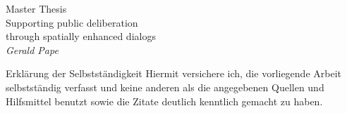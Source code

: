 \onecolumn

\thispagestyle{empty}

\vspace*{\baselineskip} %

{\LARGE Master Thesis}\\[2\baselineskip] %


{\Huge Supporting public deliberation\\through spatially enhanced dialogs}\\[\baselineskip] %

{\Large \textit{Gerald Pape}}\par %

\vfill %


\vspace*{3\baselineskip} %




 
 
 


\newpage
\LARGE{Erkl{\"a}rung der Selbstst{\"a}ndigkeit}
\vspace{2em}
\large{Hiermit versichere ich, die vorliegende Arbeit selbstst{\"a}ndig verfasst und keine anderen als die angegebenen Quellen und Hilfsmittel benutzt sowie die Zitate deutlich kenntlich gemacht zu haben.}

\twocolumn